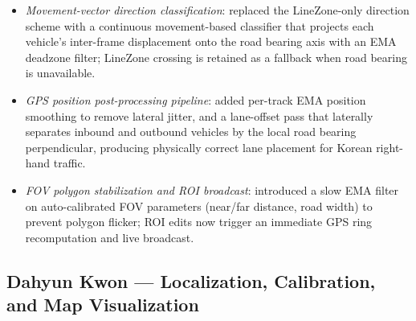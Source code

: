 \documentclass[conference]{IEEEtran}
\renewcommand{\_}{\textunderscore\allowbreak}
\begin{document}
\begin{itemize}
  \texttt{\_frame\_count\_lock}) with all GPU-inference lock acquisitions
  routed through \texttt{asyncio.to\_thread}.
  Hardened HLS stream connection in \texttt{open\_video\_source}: after
  \texttt{isOpened()} succeeds, the function loops \texttt{read()} for up to
  3\,seconds to confirm a frame actually arrives---catching token-expired or
  404-segment failures that previously caused silent infinite-retry loops.
  \texttt{VideoStream.reconnect()} was moved to \texttt{asyncio.to\_thread} so
  the 3-second blocking validation no longer stalls the event loop.
  \item \emph{Movement-vector direction classification}:
  replaced the LineZone-only direction scheme with a continuous movement-based
  classifier that projects each vehicle's inter-frame displacement onto the road
  bearing axis with an EMA deadzone filter; LineZone crossing is retained as a
  fallback when road bearing is unavailable.
  \item \emph{GPS position post-processing pipeline}:
  added per-track EMA position smoothing to remove lateral jitter, and a
  lane-offset pass that laterally separates inbound and outbound vehicles by the
  local road bearing perpendicular, producing physically correct lane placement
  for Korean right-hand traffic.
  \item \emph{FOV polygon stabilization and ROI broadcast}:
  introduced a slow EMA filter on auto-calibrated FOV parameters (near/far
  distance, road width) to prevent polygon flicker; ROI edits now trigger an
  immediate GPS ring recomputation and live broadcast.
\end{itemize}

\subsection*{Dahyun Kwon --- Localization, Calibration, and Map Visualization}
\end{document}
